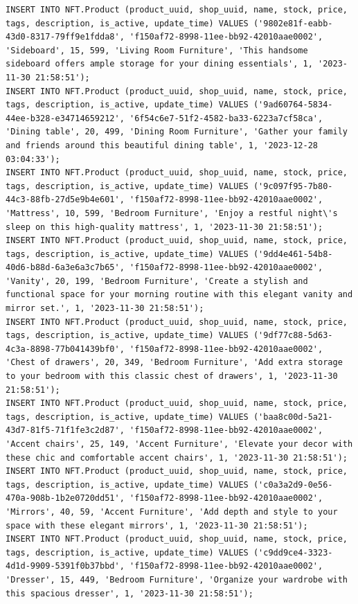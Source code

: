 \documentclass[a4paper, 12pt]{article}
\begin{document}
\begin{lstlisting}
INSERT INTO NFT.Product (product_uuid, shop_uuid, name, stock, price, tags, description, is_active, update_time) VALUES ('9802e81f-eabb-43d0-8317-79ff9e1fdda8', 'f150af72-8998-11ee-bb92-42010aae0002', 'Sideboard', 15, 599, 'Living Room Furniture', 'This handsome sideboard offers ample storage for your dining essentials', 1, '2023-11-30 21:58:51');
INSERT INTO NFT.Product (product_uuid, shop_uuid, name, stock, price, tags, description, is_active, update_time) VALUES ('9ad60764-5834-44ee-b328-e34714659212', '6f54c6e7-51f2-4582-ba33-6223a7cf58ca', 'Dining table', 20, 499, 'Dining Room Furniture', 'Gather your family and friends around this beautiful dining table', 1, '2023-12-28 03:04:33');
INSERT INTO NFT.Product (product_uuid, shop_uuid, name, stock, price, tags, description, is_active, update_time) VALUES ('9c097f95-7b80-44c3-88fb-27d5e9b4e601', 'f150af72-8998-11ee-bb92-42010aae0002', 'Mattress', 10, 599, 'Bedroom Furniture', 'Enjoy a restful night\'s sleep on this high-quality mattress', 1, '2023-11-30 21:58:51');
INSERT INTO NFT.Product (product_uuid, shop_uuid, name, stock, price, tags, description, is_active, update_time) VALUES ('9dd4e461-54b8-40d6-b88d-6a3e6a3c7b65', 'f150af72-8998-11ee-bb92-42010aae0002', 'Vanity', 20, 199, 'Bedroom Furniture', 'Create a stylish and functional space for your morning routine with this elegant vanity and mirror set.', 1, '2023-11-30 21:58:51');
INSERT INTO NFT.Product (product_uuid, shop_uuid, name, stock, price, tags, description, is_active, update_time) VALUES ('9df77c88-5d63-4c3a-8898-77b041439bf0', 'f150af72-8998-11ee-bb92-42010aae0002', 'Chest of drawers', 20, 349, 'Bedroom Furniture', 'Add extra storage to your bedroom with this classic chest of drawers', 1, '2023-11-30 21:58:51');
INSERT INTO NFT.Product (product_uuid, shop_uuid, name, stock, price, tags, description, is_active, update_time) VALUES ('baa8c00d-5a21-43d7-81f5-71f1fe3c2d87', 'f150af72-8998-11ee-bb92-42010aae0002', 'Accent chairs', 25, 149, 'Accent Furniture', 'Elevate your decor with these chic and comfortable accent chairs', 1, '2023-11-30 21:58:51');
INSERT INTO NFT.Product (product_uuid, shop_uuid, name, stock, price, tags, description, is_active, update_time) VALUES ('c0a3a2d9-0e56-470a-908b-1b2e0720dd51', 'f150af72-8998-11ee-bb92-42010aae0002', 'Mirrors', 40, 59, 'Accent Furniture', 'Add depth and style to your space with these elegant mirrors', 1, '2023-11-30 21:58:51');
INSERT INTO NFT.Product (product_uuid, shop_uuid, name, stock, price, tags, description, is_active, update_time) VALUES ('c9dd9ce4-3323-4d1d-9909-5391f0b37bbd', 'f150af72-8998-11ee-bb92-42010aae0002', 'Dresser', 15, 449, 'Bedroom Furniture', 'Organize your wardrobe with this spacious dresser', 1, '2023-11-30 21:58:51');

\end{lstlisting}
\end{document}
